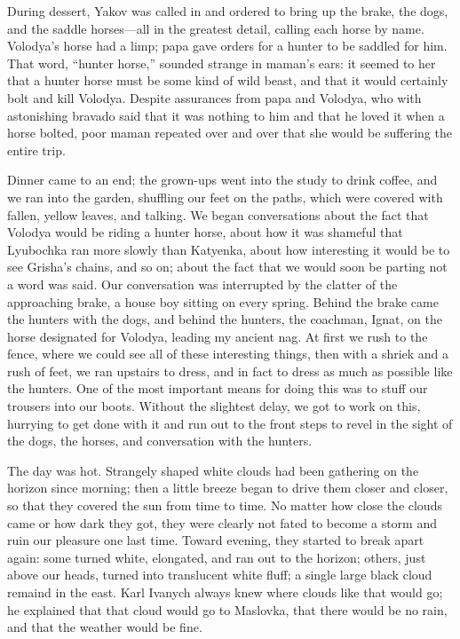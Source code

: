 During dessert, Yakov was called in and ordered to bring up the brake, the dogs, and the saddle horses---all in the greatest detail, calling each horse by name. Volodya's horse had a limp; papa gave orders for a hunter to be saddled for him. That word, ``hunter horse,'' sounded strange in maman's ears: it seemed to her that a hunter horse must be some kind of wild beast, and that it would certainly bolt and kill Volodya. Despite assurances from papa and Volodya, who with astonishing bravado said that it was nothing to him and that he loved it when a horse bolted, poor maman repeated over and over that she would be suffering the entire trip.

Dinner came to an end; the grown-ups went into the study to drink coffee, and we ran into the garden, shuffling our feet on the paths, which were covered with fallen, yellow leaves, and talking. We began conversations about the fact that Volodya would be riding a hunter horse, about how it was shameful that Lyubochka ran more slowly than Katyenka, about how interesting it would be to see Grisha's chains, and so on; about the fact that we would soon be parting not a word was said. Our conversation was interrupted by the clatter of the approaching brake, a house boy sitting on every spring. Behind the brake came the hunters with the dogs, and behind the hunters, the coachman, Ignat, on the horse designated for Volodya, leading my ancient nag. At first we rush to the fence, where we could see all of these interesting things, then with a shriek and a rush of feet, we ran upstairs to dress, and in fact to dress as much as possible like the hunters. One of the most important means for doing this was to stuff our trousers into our boots. Without the slightest delay, we got to work on this, hurrying to get done with it and run out to the front steps to revel in the sight of the dogs, the horses, and conversation with the hunters.

The day was hot. Strangely shaped white clouds had been gathering on the horizon since morning; then a little breeze began to drive them closer and closer, so that they covered the sun from time to time. No matter how close the clouds came or how dark they got, they were clearly not fated to become a storm and ruin our pleasure one last time. Toward evening, they started to break apart again: some turned white, elongated, and ran out to the horizon; others, just above our heads, turned into translucent white fluff; a single large black cloud remaind in the east. Karl Ivanych always knew where clouds like that would go; he explained that that cloud would go to Maslovka, that there would be no rain, and that the weather would be fine.

